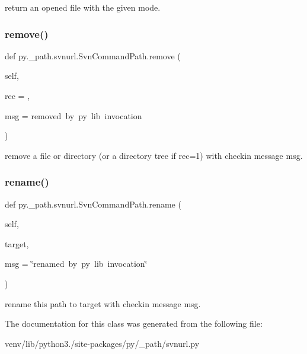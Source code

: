 \begin{DoxyVerb}return an opened file with the given mode. \end{DoxyVerb}
 \mbox{\label{classpy_1_1__path_1_1svnurl_1_1_svn_command_path_a0659be1acadcbb206fe24d69587c5327}} 
\subsubsection{\texorpdfstring{remove()}{remove()}}
{\footnotesize\ttfamily def py.\+\_\+path.\+svnurl.\+Svn\+Command\+Path.\+remove (\begin{DoxyParamCaption}\item[{}]{self,  }\item[{}]{rec = {},  }\item[{}]{msg = {\ttfamily \textquotesingle{}removed~by~py~lib~invocation\textquotesingle{}} }\end{DoxyParamCaption})}

\begin{DoxyVerb}remove a file or directory (or a directory tree if rec=1) with
checkin message msg.\end{DoxyVerb}
 \mbox{\label{classpy_1_1__path_1_1svnurl_1_1_svn_command_path_a6cc47cfdd362d1c6ef80029cacefc174}} 
\subsubsection{\texorpdfstring{rename()}{rename()}}
{\footnotesize\ttfamily def py.\+\_\+path.\+svnurl.\+Svn\+Command\+Path.\+rename (\begin{DoxyParamCaption}\item[{}]{self,  }\item[{}]{target,  }\item[{}]{msg = {\ttfamily \char`\"{}renamed~by~py~lib~invocation\char`\"{}} }\end{DoxyParamCaption})}

\begin{DoxyVerb}rename this path to target with checkin message msg. \end{DoxyVerb}
 

The documentation for this class was generated from the following file\+:\begin{DoxyCompactItemize}
\item 
venv/lib/python3./site-\/packages/py/\+\_\+path/svnurl.\+py\end{DoxyCompactItemize}
